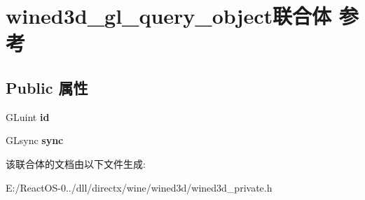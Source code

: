 \hypertarget{unionwined3d__gl__query__object}{}\section{wined3d\+\_\+gl\+\_\+query\+\_\+object联合体 参考}
\label{unionwined3d__gl__query__object}
\subsection*{Public 属性}
\begin{DoxyCompactItemize}
\item 
\mbox{\label{unionwined3d__gl__query__object_a362af6ce0c5b6ddf06ed753b7762d336}} 
G\+Luint {\bfseries id}
\item 
\mbox{\label{unionwined3d__gl__query__object_a592ec92c02ed60267a63118396d74783}} 
G\+Lsync {\bfseries sync}
\end{DoxyCompactItemize}


该联合体的文档由以下文件生成\+:\begin{DoxyCompactItemize}
\item 
E\+:/\+React\+O\+S-\/0../dll/directx/wine/wined3d/wined3d\+\_\+private.\+h\end{DoxyCompactItemize}
